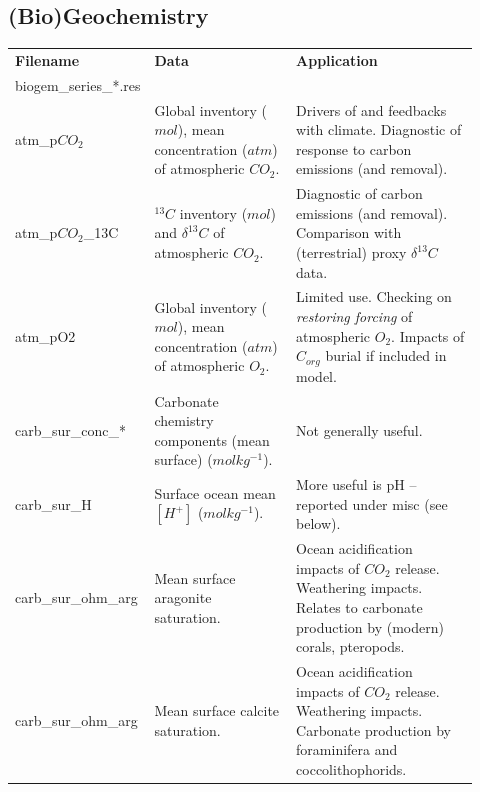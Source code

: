 \documentclass[11pt,fleqn]{book} %
\begin{document}
%
\clearpage
\subsection{(Bio)Geochemistry}

\begin{table}[ht]
\begin{tabular}{p{0.2\linewidth} p{0.317\linewidth} p{0.4\linewidth}}
\toprule
\textbf{Filename} & \textbf{Data} & \textbf{Application}\\
\textsf{\footnotesize biogem\_series\_*.res} & &\\
\midrule

\textsf{\footnotesize atm\_p\(CO_{2}\)} & \small{Global inventory (\(mol\)), mean concentration (\(atm\)) of atmospheric \(CO_{2}\). } & \small{Drivers of and feedbacks with climate. Diagnostic of response to carbon emissions (and removal).}\\
\textsf{\footnotesize atm\_p\(CO_{2}\)\_13C} & \small{\(^{13}C\) inventory (\(mol\)) and \(\delta^{13}C\) of atmospheric \(CO_{2}\).} & \small{Diagnostic of carbon emissions (and removal). Comparison with (terrestrial) proxy \(\delta^{13}C\) data.}\\
\textsf{\footnotesize atm\_pO2} & \small{Global inventory (\(mol\)), mean concentration (\(atm\)) of atmospheric \(O_{2}\). } & \small{ Limited use. Checking on \textit{restoring forcing} of atmospheric \(O_{2}\). Impacts of \(C_{org}\) burial if included in model.}\\

\midrule

\textsf{\footnotesize carb\_sur\_conc\_*} & \small{Carbonate chemistry components (mean surface) (\(molkg^{-1}\)).} & \small{Not generally useful. }\\
\textsf{\footnotesize carb\_sur\_H} & \small{Surface ocean mean \([H^{+}]\) (\(molkg^{-1}\)).} & \small{More useful is pH -- reported under \textsf{\footnotesize misc} (see below). }\\
\textsf{\footnotesize carb\_sur\_ohm\_arg} & \small{Mean surface aragonite saturation.} & \small{Ocean acidification impacts of \(CO_{2}\) release. Weathering impacts. Relates to carbonate production by (modern) corals, pteropods.}\\
\textsf{\footnotesize carb\_sur\_ohm\_arg} & \small{Mean surface calcite saturation.} & \small{Ocean acidification impacts of \(CO_{2}\) release. Weathering impacts. Carbonate production by foraminifera and coccolithophorids.}\\


\end{tabular}
\end{table}
\end{document}
